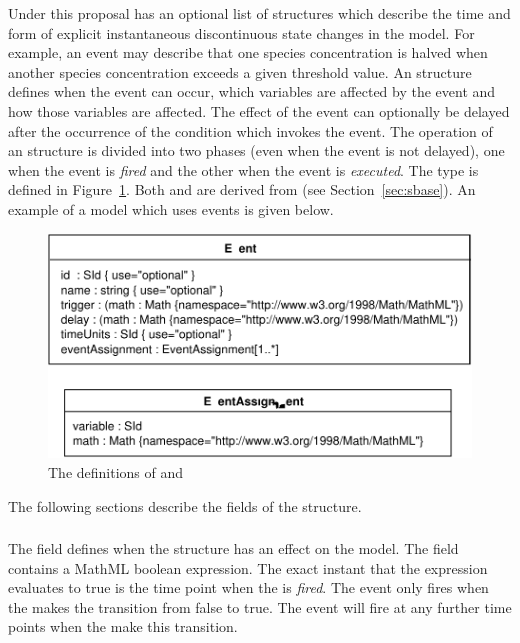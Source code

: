 \documentclass[10pt,twocolumntoc]{cekarticle}
\newcommand{\vref}[1]{\ref{#1}}
\begin{document}
Under this proposal  has an optional list of  structures which describe the time and form of explicit instantaneous discontinuous state changes in the model.  For example, an event may describe that one species concentration is halved when another species concentration exceeds a given threshold value.  An  structure defines when the event can occur, which variables are affected by the event and how those variables are affected. The effect of the event can optionally be delayed after the occurrence of the condition which invokes the event. The operation of an  structure is divided into two phases (even when the event is not delayed), one when the event is \emph{fired} and the other when the event is \emph{executed}. The  type is defined in Figure~\vref{fig:event}.  Both  and  are derived from  (see Section~\ref{sec:sbase}).  An example of a model which uses events is given below.

\begin{figure}[htb]
  \centering
  \includegraphics[scale = 0.68]{event}
  \caption{The definitions of  and }
  \label{fig:event}
\end{figure}

The following sections describe the fields of the 
structure.

\subsubsection{}
The  field defines when the 
structure has an effect on the model.  The  field
contains a MathML boolean expression.  The exact instant that the
expression evaluates to true is the time point when the
 is \emph{fired}.  The event only fires when the
 makes the transition from false to true.  The
event will fire at any further time points when the
 make this transition.
\end{document}
